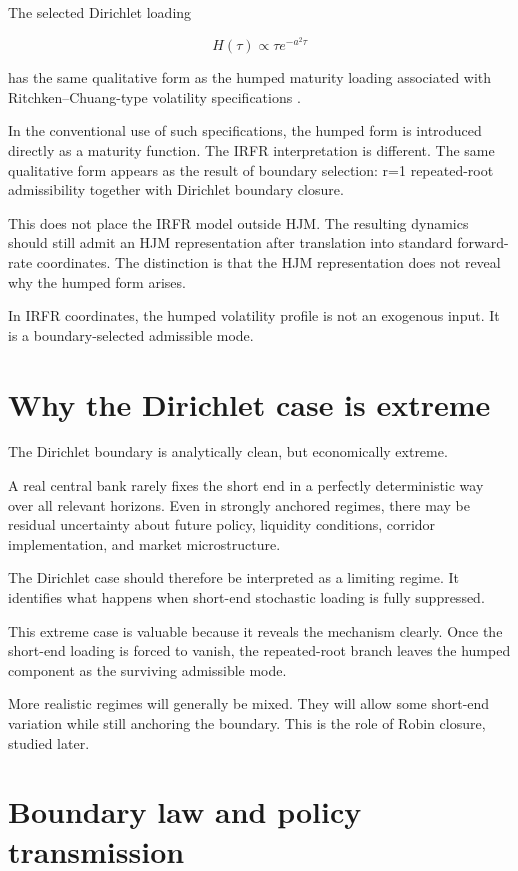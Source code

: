 \documentclass[11pt,oneside]{book}
\begin{document}
The selected Dirichlet loading

\[
H(\tau)\propto\tau e^{-a^2\tau}
\]

has the same qualitative form as the humped maturity loading associated
with Ritchken--Chuang-type volatility specifications \cite{RitchkenChuang1999,RitchkenSankarasubramanian1995}.

In the conventional use of such specifications, the humped form is
introduced directly as a maturity function. The IRFR interpretation is
different. The same qualitative form appears as the result of boundary
selection: r=1 repeated-root admissibility together with Dirichlet
boundary closure.

This does not place the IRFR model outside HJM. The resulting dynamics
should still admit an HJM representation after translation into standard
forward-rate coordinates. The distinction is that the HJM representation
does not reveal why the humped form arises.

In IRFR coordinates, the humped volatility profile is not an exogenous
input. It is a boundary-selected admissible mode.

\section{Why the Dirichlet case is
extreme}\label{why-the-dirichlet-case-is-extreme}

The Dirichlet boundary is analytically clean, but economically extreme.

A real central bank rarely fixes the short end in a perfectly
deterministic way over all relevant horizons. Even in strongly anchored
regimes, there may be residual uncertainty about future policy,
liquidity conditions, corridor implementation, and market
microstructure.

The Dirichlet case should therefore be interpreted as a limiting regime.
It identifies what happens when short-end stochastic loading is fully
suppressed.

This extreme case is valuable because it reveals the mechanism clearly.
Once the short-end loading is forced to vanish, the repeated-root branch
leaves the humped component as the surviving admissible mode.

More realistic regimes will generally be mixed. They will allow some
short-end variation while still anchoring the boundary. This is the role
of Robin closure, studied later.

\section{Boundary law and policy
transmission}\label{boundary-law-and-policy-transmission}
\end{document}
